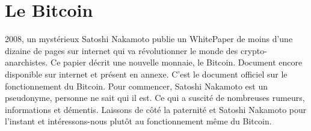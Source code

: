 \documentclass{bredele} %
\begin{document}
    \chapter{Le Bitcoin}
    2008, un mystérieux Satoshi Nakamoto publie un WhitePaper de moins d’une dizaine de pages sur internet qui va révolutionner le monde des crypto-anarchistes.
    \newline
    Ce papier décrit une nouvelle monnaie, le Bitcoin. Document encore disponible sur internet et présent en annexe. C’est le document officiel sur le fonctionnement du Bitcoin.
    \newline
    Pour commencer, Satoshi Nakamoto est un pseudonyme, personne ne sait qui il est. Ce qui a suscité de nombreuses rumeurs, informations et démentis. Laissons de côté la paternité et Satoshi Nakamoto pour l’instant et intéressons-nous plutôt au fonctionnement même du Bitcoin.
\end{document}
